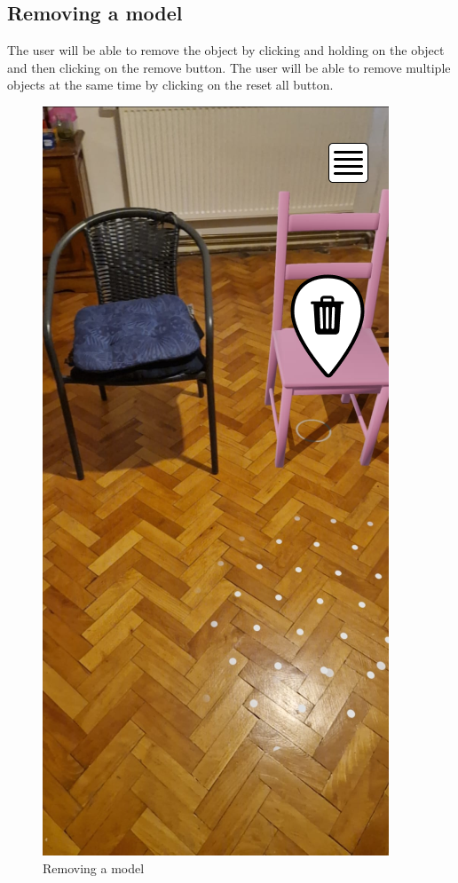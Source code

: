 \subsection{Removing a model}
The user will be able to remove the object by clicking and holding on the object and then clicking on the remove button. The user will be able to remove multiple objects at the same time by clicking on the reset all button.
\begin{figure}[h!]
    \begin{center}
        \includegraphics[scale=0.5]{img/App_mock/iPhone 14 - 7.png}
        \caption{Removing a model}
        \label{fig:remove-a-model}
    \end{center}
\end{figure}
\pagebreak


